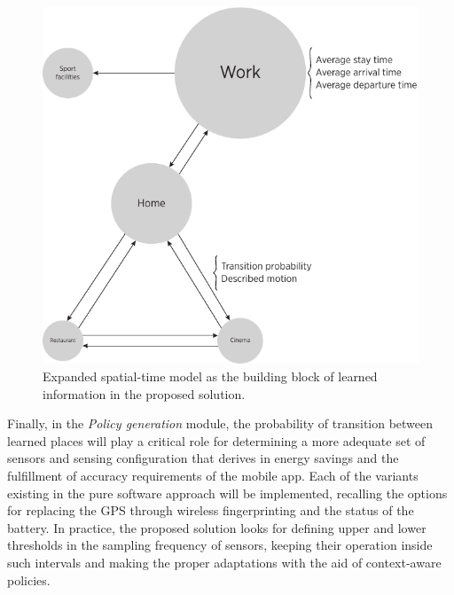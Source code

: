 \documentclass[ENG,PhD]{cinvestav}
\begin{document}
\begin{figure}[t]
  \centering
  \includegraphics[scale=0.85]{mobility-graph}
  \caption{Expanded spatial-time model as the building block of learned information in the proposed solution.}
  \label{fig:expanded-spatial-time model}
\end{figure}

Finally, in the \emph{Policy generation} module, the probability of transition between learned places will play a critical role for determining a more adequate set of sensors and sensing configuration that derives in energy savings and the fulfillment of accuracy requirements of the mobile app.
Each of the variants existing in the pure software approach will be implemented, recalling the options for replacing the GPS through wireless fingerprinting and the status of the battery.
In practice, the proposed solution looks for defining upper and lower thresholds in the sampling frequency of sensors, keeping their operation inside such intervals and making the proper adaptations with the aid of context-aware policies.
\end{document}
